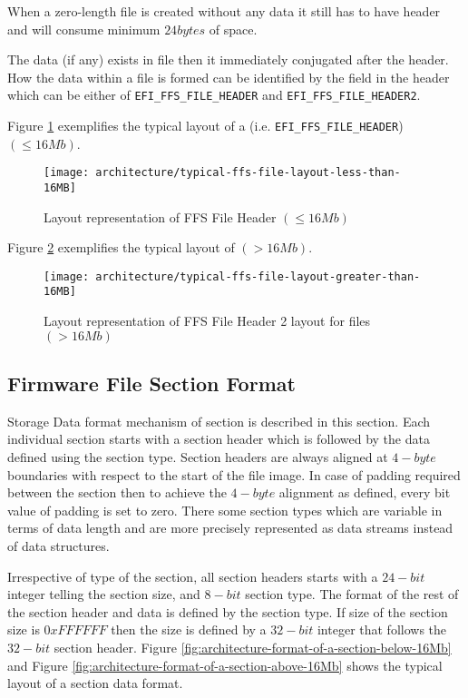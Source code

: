 When a zero-length file is created without any data it still has to have header and will consume minimum $ 24 bytes $ of space.

The data (if any) exists in file then it immediately conjugated after the header. How the data within a file
is formed can be identified by the  field in the header which can be either of \verb|EFI_FFS_FILE_HEADER| and \verb|EFI_FFS_FILE_HEADER2|.

Figure \ref{fig:architecture-typical-ffs-file-layout-less-than-16MB} exemplifies the typical layout of a (i.e. \verb|EFI_FFS_FILE_HEADER|)  $ (\leq 16 Mb) $.

\begin{figure}[!htbp]
	\centering
	\texttt{[image: architecture/typical-ffs-file-layout-less-than-16MB]}
	\caption{Layout representation of FFS File Header $ (\leq 16 Mb) $ }\label{fig:architecture-typical-ffs-file-layout-less-than-16MB}
\end{figure}

Figure \ref{fig:architecture-typical-ffs-file-layout-greater-than-16MB} exemplifies the typical layout of  $ (> 16 Mb) $.

\begin{figure}[!htbp]
	\centering
	\texttt{[image: architecture/typical-ffs-file-layout-greater-than-16MB]}
	\caption{Layout representation of FFS File Header 2 layout for files $ (> 16Mb) $}\label{fig:architecture-typical-ffs-file-layout-greater-than-16MB}
\end{figure}


\subsection{Firmware File Section Format}
Storage Data format mechanism of section is described in this section. Each individual section starts with a section header which is followed by the data defined using the section type. Section headers are always aligned at $ 4-byte $ boundaries with respect to the start of the file image. In case of padding required between the section then to achieve the $ 4-byte $
alignment as defined, every bit value of padding is set to zero.
There some section types which are variable in terms of data length and are more precisely represented as data streams instead of data structures.

Irrespective of type of the section, all section headers starts with a $ 24-bit $ integer telling the section size, and $ 8-bit $ section type. The format of the rest of the section header and data is defined by the section type. If size of the section size is $ 0xFFFFFF $ then the size is defined by a $ 32-bit $ integer that follows the $ 32-bit $ section header. Figure \ref{fig:architecture-format-of-a-section-below-16Mb} and Figure \ref{fig:architecture-format-of-a-section-above-16Mb} shows the typical layout of a section data format.

